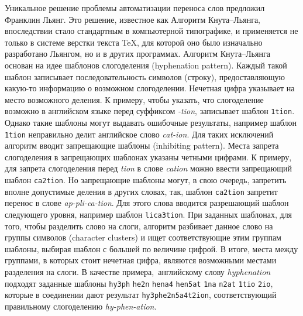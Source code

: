 \documentclass[12pt,a4paper,oneside]{extarticle}
\begin{document}
Уникальное решение проблемы автоматизации переноса слов предложил Франклин Льянг\autocite[][]{liang1983}. Это решение, известное как Алгоритм Кнута--Льянга, впоследствии стало стандартным в компьютерной типографике, и применяется не только в системе верстки текста \TeX{}, для которой оно было изначально разработано Льянгом, но и в других программах\autocite[Первое описание системы \TeX{} см. ][]{knuth1979}. Алгоритм Кнута--Льянга основан на идее шаблонов слогоделения (\textenglish{hyphenation pattern}). Каждый такой шаблон записывает последовательность символов (строку), предоставляющую какую-то информацию о возможном слогоделении. Нечетная цифра указывает на место возможного деления. К примеру, чтобы указать, что слогоделение возможно в английском языке перед суффиксом \emph{-tion}, записывает шаблон \verb+1tion+. Однако такие шаблоны могут выдавать ошибочные результаты, например шаблон \verb+1tion+ неправильно делит английское слово \emph{cat-ion}. Для таких исключений алгоритм вводит запрещающие шаблоны (\textenglish{inhibiting pattern}). Места запрета слогоделения в запрещающих шаблонах указаны четными цифрами. К примеру, для запрета слогоделения перед \emph{tion} в слове \emph{cation} можно ввести запрещающий шаблон \verb+ca2tion+. Но запрещающие шаблоны могут, в свою очередь, запретить вполне допустимые деления в других словах, так, шаблон \verb+ca2tion+ запретит перенос в слове \emph{ap-pli-ca-tion}. Для этого слова вводится разрешающий шаблон следующего уровня, например шаблон \verb+lica3tion+. При заданных шаблонах, для того, чтобы разделить слово на слоги, алгоритм разбивает данное слово на группы символов (\textenglish{character clusters}) и ищет соответствующие этим группам шаблоны, выбирая шаблон с большей по величине цифрой. В итоге, места между группами, в которых стоит нечетная цифра, являются возможными местами разделения на слоги. В качестве примера, английскому слову \emph{hyphenation} подходят заданные шаблоны \verb+hy3ph+ \verb+he2n+ \verb+hena4+ \verb+hen5at+ \verb+1na+ \verb+n2at+ \verb+1tio+ \verb+2io+, которые в соединении дают результат \verb+hy3phe2n5a4t2ion+, соответствующий правильному слогоделению \emph{hy-phen-ation}\autocite[См. подробнее ][pp.~5--6, 35--40.]{liang1983}.
\end{document}
